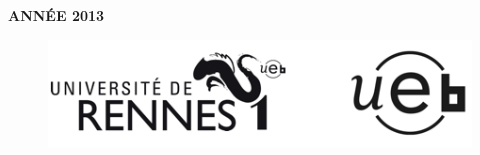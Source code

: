 







\newlength{\plarg}
\setlength{\plarg}{8cm}
\newlength{\glarg}
\setlength{\glarg}{14cm}
\newlength{\Glarg}
\setlength{\Glarg}{15cm}

\begin{titlepage}
\thispagestyle{empty}



\vspace{-1cm}
\begin{minipage}{\glarg}
\vspace{-4.5cm}
{\color{gris}\large\hfill \bf ANN\'EE 2013}
\end{minipage}
\vspace{-2cm}
\begin{figure}[htp]
\center
\hspace{-1cm}\includegraphics[angle=0,width=14cm]{Logos.png}
\end{figure}


\end{titlepage}
